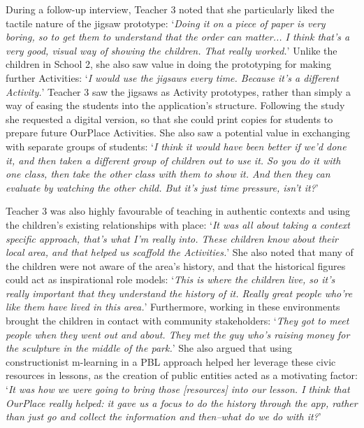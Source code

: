 \documentclass[,hyphens]{sigchi}
\begin{document}
During a follow-up interview, Teacher 3 noted that she particularly liked the tactile nature of the jigsaw prototype: `\textit{Doing it on a piece of paper is very boring, so to get them to understand that the order can matter... I think that's a very good, visual way of showing the children. That really worked.}' Unlike the children in School 2, she also saw value in doing the prototyping for making further Activities: `\textit{I would use the jigsaws every time. Because it's a different Activity.}' Teacher 3 saw the jigsaws as Activity prototypes, rather than simply a way of easing the students into the application's structure. Following the study she requested a digital version, so that she could print copies for students to prepare future OurPlace Activities. She also saw a potential value in exchanging with separate groups of students: `\textit{I think it would have been better if we'd done it, and then taken a different group of children out to use it. So you do it with one class, then take the other class with them to show it. And then they can evaluate by watching the other child. But it's just time pressure, isn't it?}'

Teacher 3 was also highly favourable of teaching in authentic contexts and using the children's existing relationships with place: `\textit{It was all about taking a context specific approach, that's what I'm really into. These children know about their local area, and that helped us scaffold the Activities.}' She also noted that many of the children were not aware of the area's history, and that the historical figures could act as inspirational role models: `\textit{This is where the children live, so it's really important that they understand the history of it. Really great people who're like them have lived in this area.}' Furthermore, working in these environments brought the children in contact with community stakeholders: `\textit{They got to meet people when they went out and about. They met the guy who's raising money for the sculpture in the middle of the park.}' She also argued that using constructionist m-learning in a PBL approach helped her leverage these civic resources in lessons, as the creation of public entities acted as a motivating factor: `\textit{It was how we were going to bring those [resources] into our lesson. I think that OurPlace really helped: it gave us a focus to do the history through the app, rather than just go and collect the information and then--what do we do with it?}' 
\end{document}
